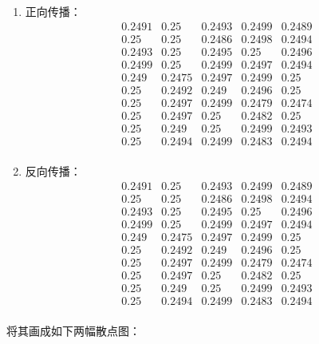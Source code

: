 \begin{enumerate}
  \item 正向传播：
        \[
          \begin{array}{cccccccccc}
            0.2491 & 0.25 & 0.2493 & 0.2499 & 0.2489 \\ 
            0.25 & 0.25 & 0.2486 & 0.2498 & 0.2494 \\ 
            0.2493 & 0.25 & 0.2495 & 0.25 & 0.2496 \\ 
            0.2499 & 0.25 & 0.2499 & 0.2497 & 0.2494 \\ 
            0.249 & 0.2475 & 0.2497 & 0.2499 & 0.25 \\ 
            0.25 & 0.2492 & 0.249 & 0.2496 & 0.25 \\ 
            0.25 & 0.2497 & 0.2499 & 0.2479 & 0.2474 \\ 
            0.25 & 0.2497 & 0.25 & 0.2482 & 0.25 \\ 
            0.25 & 0.249 & 0.25 & 0.2499 & 0.2493 \\ 
            0.25 & 0.2494 & 0.2499 & 0.2483 & 0.2494 \\ 
          \end{array}
        \]
  \item 反向传播：
        \[
          \begin{array}{cccccccccc}
            0.2491 & 0.25 & 0.2493 & 0.2499 & 0.2489 \\ 
            0.25 & 0.25 & 0.2486 & 0.2498 & 0.2494 \\ 
            0.2493 & 0.25 & 0.2495 & 0.25 & 0.2496 \\ 
            0.2499 & 0.25 & 0.2499 & 0.2497 & 0.2494 \\ 
            0.249 & 0.2475 & 0.2497 & 0.2499 & 0.25 \\ 
            0.25 & 0.2492 & 0.249 & 0.2496 & 0.25 \\ 
            0.25 & 0.2497 & 0.2499 & 0.2479 & 0.2474 \\ 
            0.25 & 0.2497 & 0.25 & 0.2482 & 0.25 \\ 
            0.25 & 0.249 & 0.25 & 0.2499 & 0.2493 \\ 
            0.25 & 0.2494 & 0.2499 & 0.2483 & 0.2494 \\   
          \end{array}
        \]
\end{enumerate}

将其画成如下两幅散点图：

